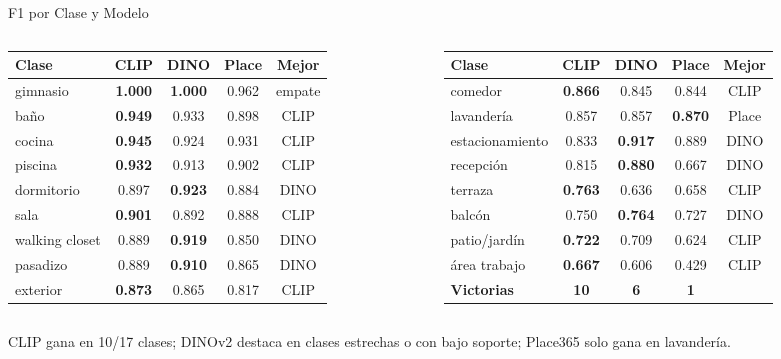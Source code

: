 \documentclass[aspectratio=169]{beamer}
\begin{document}
\begin{frame}{F1 por Clase y Modelo}
\centering
\scriptsize
\begin{columns}[T]
\begin{column}{0.49\textwidth}
\begin{tabular}{@{}lcccc@{}}
\toprule
\textbf{Clase} & \textbf{CLIP} & \textbf{DINO} & \textbf{Place} & \textbf{Mejor} \\
\midrule
gimnasio & \textbf{1.000} & \textbf{1.000} & 0.962 & empate \\
ba\~no & \textbf{0.949} & 0.933 & 0.898 & CLIP \\
cocina & \textbf{0.945} & 0.924 & 0.931 & CLIP \\
piscina & \textbf{0.932} & 0.913 & 0.902 & CLIP \\
dormitorio & 0.897 & \textbf{0.923} & 0.884 & DINO \\
sala & \textbf{0.901} & 0.892 & 0.888 & CLIP \\
walking closet & 0.889 & \textbf{0.919} & 0.850 & DINO \\
pasadizo & 0.889 & \textbf{0.910} & 0.865 & DINO \\
exterior & \textbf{0.873} & 0.865 & 0.817 & CLIP \\
\bottomrule
\end{tabular}
\end{column}
\begin{column}{0.49\textwidth}
\begin{tabular}{@{}lcccc@{}}
\toprule
\textbf{Clase} & \textbf{CLIP} & \textbf{DINO} & \textbf{Place} & \textbf{Mejor} \\
\midrule
comedor & \textbf{0.866} & 0.845 & 0.844 & CLIP \\
lavander\'ia & 0.857 & 0.857 & \textbf{0.870} & Place \\
estacionamiento & 0.833 & \textbf{0.917} & 0.889 & DINO \\
recepci\'on & 0.815 & \textbf{0.880} & 0.667 & DINO \\
terraza & \textbf{0.763} & 0.636 & 0.658 & CLIP \\
balc\'on & 0.750 & \textbf{0.764} & 0.727 & DINO \\
patio/jard\'in & \textbf{0.722} & 0.709 & 0.624 & CLIP \\
\'area trabajo & \textbf{0.667} & 0.606 & 0.429 & CLIP \\
\midrule
\textbf{Victorias} & \textbf{10} & \textbf{6} & \textbf{1} & \\
\bottomrule
\end{tabular}
\end{column}
\end{columns}

\vspace{0.2cm}
{\footnotesize CLIP gana en 10/17 clases; DINOv2 destaca en clases estrechas o con bajo soporte; Place365 solo gana en lavander\'ia.}
\end{frame}
\end{document}
